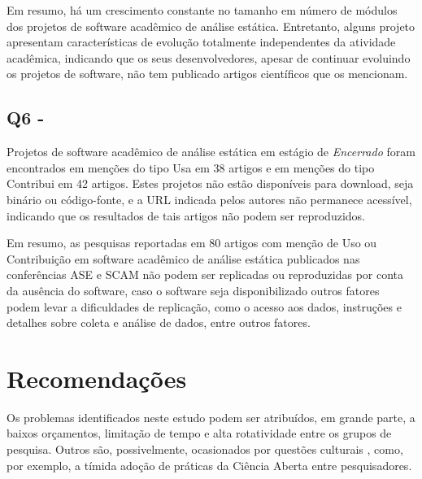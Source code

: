 Em resumo, há um crescimento constante no tamanho em número de módulos dos
projetos de software acadêmico de análise estática.
Entretanto, alguns projeto apresentam características de evolução 
totalmente independentes da atividade acadêmica, 
indicando que os seus desenvolvedores, 
apesar de continuar evoluindo os projetos de software,
não tem publicado artigos científicos que os mencionam.

\subsection{Q6 - \QuestaoSeis}

Projetos de software acadêmico de análise estática em estágio de {\it Encerrado} 
foram encontrados em menções do tipo Usa em 38 artigos 
e em menções do tipo Contribui em 42 artigos.
Estes projetos não estão disponíveis para download, seja binário ou código-fonte, 
e a URL indicada pelos autores não permanece acessível, 
indicando que os resultados de tais artigos não podem ser reproduzidos.

Em resumo, as pesquisas reportadas em 80 artigos com menção de Uso ou Contribuição em 
software acadêmico de análise estática publicados nas conferências ASE e SCAM 
não podem ser replicadas ou reproduzidas por conta da ausência do software,
caso o software seja disponibilizado outros fatores podem levar a dificuldades
de replicação, como o acesso aos dados, instruções e detalhes sobre coleta e
análise de dados, entre outros fatores.




\section{Recomendações}
\label{sec:recomendacoes}

Os problemas identificados neste estudo podem ser atribuídos, em grande parte,
a baixos orçamentos, limitação de tempo e alta rotatividade entre os
grupos de pesquisa. Outros são, possivelmente, ocasionados por questões
culturais \cite{niemeyer2017open}, como, por exemplo, a tímida adoção de
práticas da Ciência Aberta entre pesquisadores.

